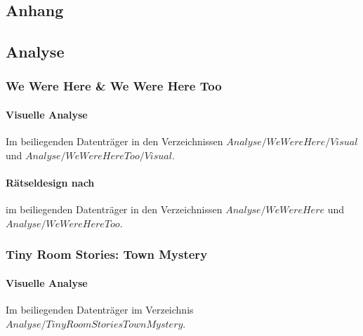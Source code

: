 \documentclass[
	12pt,
	a4paper,
	bibtotoc,
	cleardoubleempty, 
	idxtotoc,
	ngerman,
	openright
	final,
	listof=nochaptergap,
	]{scrbook}
\begin{document}

\singlespacing





\let\chaptermark\oldchaptermark

\begin{appendices}
\chapter{Anhang}

\section{Analyse}

\subsection{We Were Here \& We Were Here Too}\label{sec:append_anylsis_wwh_wwht}

\subsubsection{Visuelle Analyse}\label{sec:append_anylsis_wwh_wwht_visual}
Im beiliegenden Datenträger in den Verzeichnissen $Analyse/WeWereHere/Visual$ und $Analyse/WeWereHereToo/Visual$.

\subsubsection{Rätseldesign nach \cite{tim_schafer_grim_1996}}\label{sec:append_riddles_wwh_wwht}
im beiliegenden Datenträger in den Verzeichnissen $Analyse/WeWereHere$ und $Analyse/WeWereHereToo$.

\subsection{Tiny Room Stories: Town Mystery}\label{sec:append_anylsis_trstm}

\subsubsection{Visuelle Analyse}\label{sec:append_analysis_trstm}
Im beiliegenden Datenträger im Verzeichnis $Analyse/TinyRoomStoriesTownMystery$.


\end{appendices}
\end{document}
